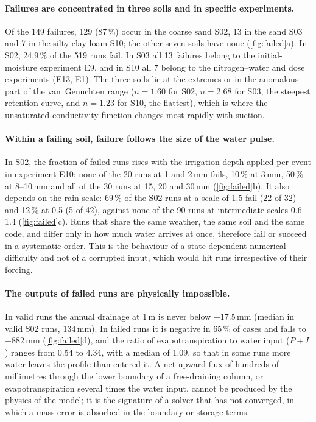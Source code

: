 \paragraph{Failures are concentrated in three soils and in specific experiments.} Of the 149 failures, 129 (87\,\%) occur in the coarse sand S02, 13 in the sand S03 and 7 in the silty clay loam S10; the other seven soils have none (\cref{fig:failed}a). In S02, 24.9\,\% of the 519 runs fail. In S03 all 13 failures belong to the initial-moisture experiment E9, and in S10 all 7 belong to the nitrogen--water and dose experiments (E13, E1). The three soils lie at the extremes or in the anomalous part of the van~Genuchten range ($n=1.60$ for S02, $n=2.68$ for S03, the steepest retention curve, and $n=1.23$ for S10, the flattest), which is where the unsaturated conductivity function changes most rapidly with suction.

\paragraph{Within a failing soil, failure follows the size of the water pulse.} In S02, the fraction of failed runs rises with the irrigation depth applied per event in experiment E10: none of the 20 runs at 1 and 2\,mm fails, 10\,\% at 3\,mm, 50\,\% at 8--10\,mm and all of the 30 runs at 15, 20 and 30\,mm (\cref{fig:failed}b). It also depends on the rain scale: 69\,\% of the S02 runs at a scale of 1.5 fail (22 of 32) and 12\,\% at 0.5 (5 of 42), against none of the 90 runs at intermediate scales 0.6--1.4 (\cref{fig:failed}c). Runs that share the same weather, the same soil and the same code, and differ only in how much water arrives at once, therefore fail or succeed in a systematic order. This is the behaviour of a state-dependent numerical difficulty and not of a corrupted input, which would hit runs irrespective of their forcing.

\paragraph{The outputs of failed runs are physically impossible.} In valid runs the annual drainage at 1\,m is never below $-17.5$\,mm (median in valid S02 runs, 134\,mm). In failed runs it is negative in 65\,\% of cases and falls to $-882$\,mm (\cref{fig:failed}d), and the ratio of evapotranspiration to water input ($P+I$) ranges from 0.54 to 4.34, with a median of 1.09, so that in some runs more water leaves the profile than entered it. A net upward flux of hundreds of millimetres through the lower boundary of a free-draining column, or evapotranspiration several times the water input, cannot be produced by the physics of the model; it is the signature of a solver that has not converged, in which a mass error is absorbed in the boundary or storage terms.

